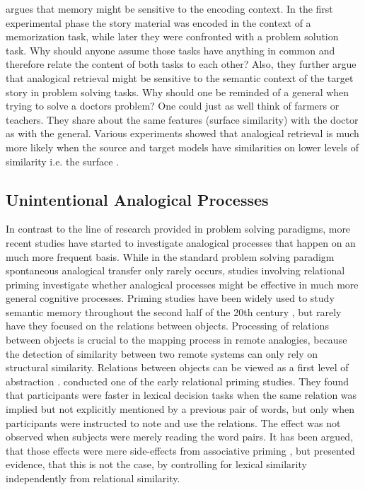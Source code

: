 \documentclass[a4paper,man,natbib,floatsintext,import]{apa6}
\begin{document}
\cite{Gick1980} argues that memory might be sensitive to the encoding context. In the first experimental phase the story material was encoded in the context of a memorization task, while later they were confronted with a problem solution task. Why should anyone assume those tasks have anything in common and therefore relate the content of both tasks to each other? Also, they further argue that analogical retrieval might be sensitive to the semantic context of the target story in problem solving tasks. Why should one be reminded of a general when trying to solve a doctors problem? One could just as well think of farmers or teachers. They share about the same features (surface similarity) with the doctor as with the general. Various experiments showed that analogical retrieval is much more likely when the source and target models have similarities on lower levels of similarity i.e. the surface \citep{Gentner1993,Holyoak1987}.

\subsection{Unintentional Analogical Processes}
In contrast to the line of research provided in problem solving paradigms, more recent studies have started to investigate analogical processes that happen on an much more frequent basis. While in the standard problem solving paradigm spontaneous analogical transfer only rarely occurs, studies involving relational priming investigate whether analogical processes might be effective in much more general cognitive processes. Priming studies have been widely used to study semantic memory throughout the second half of the 20th century \citep{Lucas2000}, but rarely have they focused on the relations between objects. Processing of relations between objects is crucial to the mapping process in remote analogies, because the detection of similarity between two remote systems can only rely on structural similarity. Relations between objects can be viewed as a first level of abstraction \citep{Catrambone2002}. \cite{Spellman2001} conducted one of the early relational priming studies. They found that participants were faster in lexical decision tasks when the same relation was implied but not explicitly mentioned by a previous pair of words, but only when participants were instructed to note and use the relations. The effect was not observed when subjects were merely reading the word pairs. It has been argued, that those effects were mere side-effects from associative priming \citep{Gagne2005}, but \cite{Estes2006} presented evidence, that this is not the case, by controlling for lexical similarity independently from relational similarity.
\end{document}
